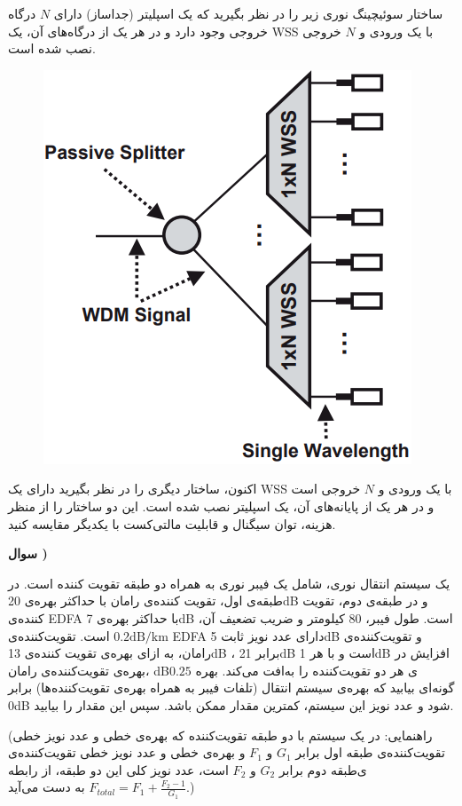\documentclass[10pt,letterpaper]{article}
\newcounter{questionnumber}
\newcommand{\Q}{
\textbf{سوال \thequestionnumber)}
\stepcounter{questionnumber}
}
\begin{document}
ساختار سوئیچینگ نوری زیر را در نظر بگیرید که یک اسپلیتر (جداساز) دارای $N$ درگاه خروجی وجود دارد و در هر یک از درگاه‌های آن، یک WSS با یک ورودی و $N$ خروجی نصب شده است.
\begin{figure}[h]
\centering
\includegraphics[scale=0.5]{Q2.png}
\end{figure}

اکنون، ساختار دیگری را در نظر بگیرید دارای یک WSS با یک ورودی و $N$ خروجی  است و در هر یک از پایانه‌های آن، یک اسپلیتر نصب شده است. این دو ساختار را از منظر هزینه، توان سیگنال و قابلیت مالتی‌کست با یکدیگر مقایسه کنید.

\hrulefill

\Q
یک سیستم انتقال نوری، شامل یک فیبر نوری به همراه دو طبقه تقویت کننده است. در طبقه‌ی اول، تقویت کننده‌ی رامان با حداکثر بهره‌ی 20dB و در طبقه‌ی دوم، تقویت کننده‌ی EDFA با حداکثر بهره‌ی 7dB است. طول فیبر، 80 کیلومتر و ضریب تضعیف آن، 
$
0.2\text{dB/km}
$
است. تقویت‌کننده‌ی EDFA دارای عدد نویز ثابت 5dB و تقویت‌کننده‌ی رامان، به ازای بهره‌ی تقویت کننده‌ی 13dB ، برابر 21dB است و با هر 1dB افزایش در بهره‌ی تقویت‌کننده‌ی رامان، dB$0.25$ افت می‌کند. بهره‎‌ی هر دو تقویت‌کننده را به گونه‌ای بیابید که بهره‌ی سیستم انتقال (تلفات فیبر به همراه بهره‌ی تقویت‌کننده‌ها) برابر 0dB شود و عدد نویز این سیستم، کمترین مقدار ممکن باشد. سپس این مقدار را بیابید.

(راهنمایی: در یک سیستم با دو طبقه تقویت‌کننده که بهره‌ی خطی و عدد نویز خطی تقویت‌کننده‌ی طبقه اول برابر
$
G_1
$
و
$
F_1
$
و بهره‌ی خطی و عدد نویز خطی تقویت‌کننده‌ی طبقه دوم برابر
$
G_2
$
و
$
F_2
$
است، عدد نویز کلی این دو طبقه‌، از رابطه‎‌‌ی 
$
F_{total}=F_1+\frac{F_2-1}{G_1}
$
به دست می‌آید.)
\end{document}
